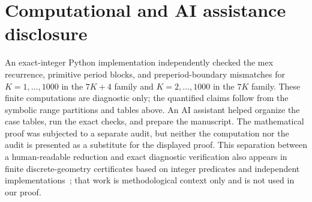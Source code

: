 \documentclass[11pt]{article}
\begin{document}
\section*{Computational and AI assistance disclosure}

An exact-integer Python implementation independently checked the mex
recurrence, primitive period blocks, and preperiod-boundary mismatches for
$K=1,\ldots,1000$ in the $7K+4$ family and $K=2,\ldots,1000$ in the $7K$
family.  These finite computations are diagnostic only; the quantified
claims follow from the symbolic range partitions and tables above.  An AI
assistant helped organize the case tables, run the exact checks, and prepare
the manuscript.  The mathematical proof was subjected to a separate audit,
but neither the computation nor the audit is presented as a substitute for
the displayed proof.  This separation between a human-readable reduction
and exact diagnostic verification also appears in finite discrete-geometry
certificates based on integer predicates and independent
implementations~\cite{ZengEtAl2026Certificates}; that work is methodological
context only and is not used in our proof.



\end{document}
